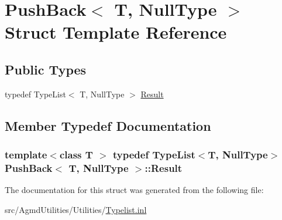 \hypertarget{struct_push_back_3_01_t_00_01_null_type_01_4}{\section{Push\+Back$<$ T, Null\+Type $>$ Struct Template Reference}
\label{struct_push_back_3_01_t_00_01_null_type_01_4}
}
\subsection*{Public Types}
\begin{DoxyCompactItemize}
\item 
typedef Type\+List$<$ T, Null\+Type $>$ \hyperlink{struct_push_back_3_01_t_00_01_null_type_01_4_a6714fd29ba9b2a432b975dddb2bcb3f7}{Result}
\end{DoxyCompactItemize}


\subsection{Member Typedef Documentation}
\hypertarget{struct_push_back_3_01_t_00_01_null_type_01_4_a6714fd29ba9b2a432b975dddb2bcb3f7}{
\subsubsection[{Result}]{\setlength{\rightskip}{0pt plus 5cm}template$<$class T $>$ typedef Type\+List$<$T, Null\+Type$>$ {\bf Push\+Back}$<$ T, Null\+Type $>$\+::{\bf Result}}}\label{struct_push_back_3_01_t_00_01_null_type_01_4_a6714fd29ba9b2a432b975dddb2bcb3f7}


The documentation for this struct was generated from the following file\+:\begin{DoxyCompactItemize}
\item 
src/\+Agmd\+Utilities/\+Utilities/\hyperlink{_typelist_8inl}{Typelist.\+inl}\end{DoxyCompactItemize}
